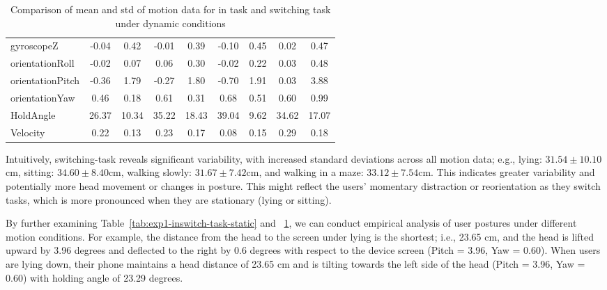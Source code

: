 \begin{table}[!htbp]
\begin{tabular}{l|cccccccc}
gyroscopeZ & -0.04 & {\cellcolor[rgb]{0.776,0.855,0.502}}0.42 & -0.01 & {\cellcolor[rgb]{0.388,0.745,0.482}}0.39 & -0.10 & {\cellcolor[rgb]{0.988,0.659,0.467}}0.45 & 0.02 & {\cellcolor[rgb]{0.973,0.412,0.42}}0.47 \\
orientationRoll & -0.02 & {\cellcolor[rgb]{0.388,0.745,0.482}}0.07 & 0.06 & {\cellcolor[rgb]{0.996,0.835,0.502}}0.30 & -0.02 & {\cellcolor[rgb]{0.878,0.886,0.51}}0.22 & 0.03 & {\cellcolor[rgb]{0.973,0.412,0.42}}0.48 \\
orientationPitch & -0.36 & {\cellcolor[rgb]{0.388,0.745,0.482}}1.79 & -0.27 & {\cellcolor[rgb]{0.514,0.78,0.486}}1.80 & -0.70 & {\cellcolor[rgb]{1,0.91,0.518}}1.91 & 0.03 & {\cellcolor[rgb]{0.973,0.412,0.42}}3.88 \\
orientationYaw & 0.46 & {\cellcolor[rgb]{0.388,0.745,0.482}}0.18 & 0.61 & {\cellcolor[rgb]{0.737,0.843,0.502}}0.31 & 0.68 & {\cellcolor[rgb]{0.996,0.835,0.502}}0.51 & 0.60 & {\cellcolor[rgb]{0.973,0.412,0.42}}0.99 \\
HoldAngle & 26.37 & {\cellcolor[rgb]{0.494,0.773,0.486}}10.34 & 35.22 & {\cellcolor[rgb]{0.973,0.412,0.42}}18.43 & 39.04 & {\cellcolor[rgb]{0.388,0.745,0.482}}9.62 & 34.62 & {\cellcolor[rgb]{0.984,0.561,0.451}}17.07 \\
Velocity & 0.22 & {\cellcolor[rgb]{0.388,0.745,0.482}}0.13 & 0.23 & {\cellcolor[rgb]{0.984,0.576,0.455}}0.17 & 0.08 & {\cellcolor[rgb]{0.788,0.859,0.502}}0.15 & 0.29 & {\cellcolor[rgb]{0.973,0.412,0.42}}0.18 \\
\hline
\end{tabular}
\caption{Comparison of mean and std of motion data for in task and switching task under dynamic conditions}\label{tab:exp1-inswitch-task-dynamic}
\end{table}


Intuitively, switching-task reveals significant variability, with increased standard deviations across all motion data; e.g., lying: \(31.54 \pm 10.10\)cm, sitting: \(34.60 \pm 8.40\)cm, walking slowly: \(31.67 \pm 7.42\)cm, and walking in a maze: \(33.12 \pm 7.54\)cm. This indicates greater variability and potentially more head movement or changes in posture. This might reflect the users' momentary distraction or reorientation as they switch tasks, which is more pronounced when they are stationary (lying or sitting).


By further examining Table~\ref{tab:exp1-inswitch-task-static} and ~\ref{tab:exp1-inswitch-task-dynamic}, we can conduct empirical analysis of user postures under different motion conditions. For example, the distance from the head to the screen under lying is the shortest; i.e., 23.65 cm, and the head is lifted upward by 3.96 degrees and deflected to the right by 0.6 degrees with respect to the device screen (Pitch = 3.96, Yaw = 0.60). When users are lying down, their phone maintains a head distance of 23.65 cm and is tilting towards the left side of the head (Pitch = 3.96, Yaw = 0.60) with holding angle of 23.29 degrees. 


